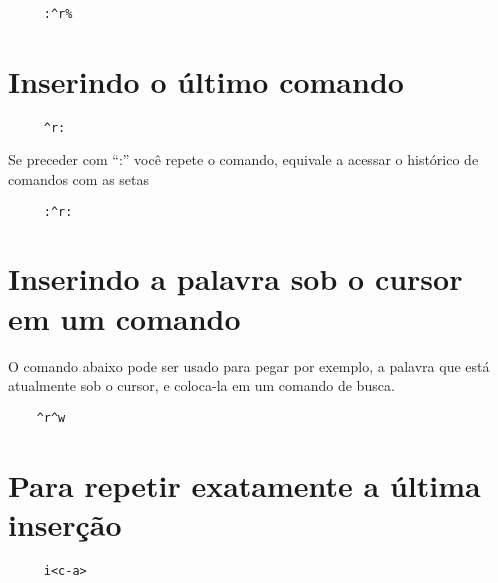 \begin{verbatim}
     :^r%
\end{verbatim}

\section{Inserindo o último comando }

\begin{verbatim}
     ^r:
\end{verbatim}

Se preceder com ``:'' você repete o comando, equivale a acessar o histórico de
comandos com as setas

\begin{verbatim}
     :^r:
\end{verbatim}

\section{Inserindo a palavra sob o cursor em um comando}

O comando abaixo pode ser usado para pegar por exemplo, a palavra
que está atualmente sob o cursor, e coloca-la em um comando de busca.

\begin{verbatim}
    ^r^w
\end{verbatim}

\section{Para repetir exatamente a última inserção }

\begin{verbatim}
     i<c-a>
\end{verbatim}
